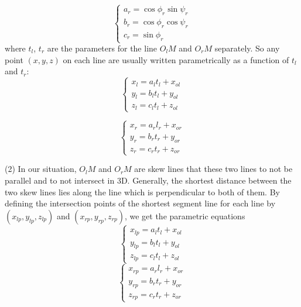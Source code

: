 \begin{equation} 
\left\{ 
\begin{array}{lll} 
a_r = \cos \phi_r \sin \psi_r\\
b_r = \cos \phi_r \cos \psi_r\\
c_r = \sin \phi_r
\end{array} 
\right.
\end{equation}
where $t_l$, $t_r$ are the parameters for the line $O_lM$ and $O_rM$ separately.
So any point $(x, y, z)$ on each line are usually written parametrically as a function of $t_l$ and $t_r$:
\begin{equation}  
	\left\{ 
	\begin{array}{lll} 
		x_l = a_l t_l + x_{ol} \\
		y_l = b_l t_l + y_{ol} \\
		z_l = c_l t_l + z_{ol}
	\end{array} 
	\right.
\end{equation}

\begin{equation}  
	\left\{ 
	\begin{array}{lll} 
		x_r = a_r l_r + x_{or} \\
		y_r = b_r t_r + y_{or} \\
		z_r = c_r t_r + z_{or}
	\end{array} 
	\right.
\end{equation}

(2) In our situation, $O_lM$ and $O_rM$ are skew lines that these two lines to not be parallel and to not intersect in 3D. Generally, the shortest distance between the two skew lines lies along the line which is perpendicular to both of them. By defining the intersection points of the shortest segment line for each line by $(x_{lp}, y_{lp}, z_{lp})$ and $(x_{rp}, y_{rp}, z_{rp})$, we get the parametric equations
\begin{equation}  
	\left\{ 
	\begin{array}{lll} 
		x_{lp} = a_l t_l + x_{ol} \\
		y_{lp} = b_l t_l + y_{ol} \\
		z_{lp} = c_l t_l + z_{ol}
	\end{array} 
	\right.
\end{equation}
\begin{equation}  
	\left\{ 
	\begin{array}{lll} 
		x_{rp} = a_r l_r + x_{or} \\
		y_{rp} = b_r t_r + y_{or} \\
		z_{rp} = c_r t_r + z_{or}
	\end{array} 
	\right.
\end{equation}


